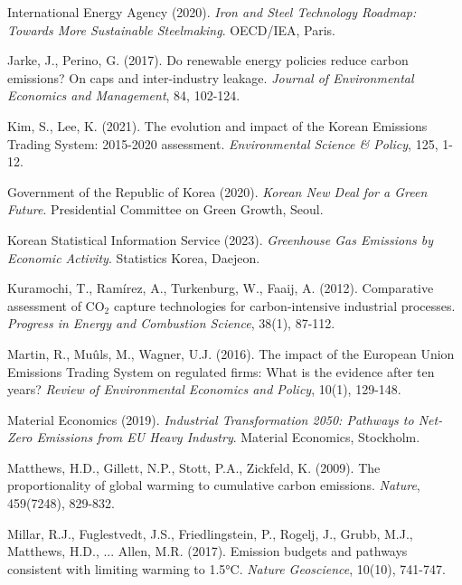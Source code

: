 \documentclass[preprint,1p,authoryear]{elsarticle}
\begin{document}
\begin{thebibliography}{99}
 International Energy Agency (2020). \textit{Iron and Steel Technology Roadmap: Towards More Sustainable Steelmaking}. OECD/IEA, Paris.

 Jarke, J., Perino, G. (2017). Do renewable energy policies reduce carbon emissions? On caps and inter-industry leakage. \textit{Journal of Environmental Economics and Management}, 84, 102-124.

 Kim, S., Lee, K. (2021). The evolution and impact of the Korean Emissions Trading System: 2015-2020 assessment. \textit{Environmental Science \& Policy}, 125, 1-12.

 Government of the Republic of Korea (2020). \textit{Korean New Deal for a Green Future}. Presidential Committee on Green Growth, Seoul.

 Korean Statistical Information Service (2023). \textit{Greenhouse Gas Emissions by Economic Activity}. Statistics Korea, Daejeon.

 Kuramochi, T., Ramírez, A., Turkenburg, W., Faaij, A. (2012). Comparative assessment of CO$_2$ capture technologies for carbon-intensive industrial processes. \textit{Progress in Energy and Combustion Science}, 38(1), 87-112.

 Martin, R., Muûls, M., Wagner, U.J. (2016). The impact of the European Union Emissions Trading System on regulated firms: What is the evidence after ten years? \textit{Review of Environmental Economics and Policy}, 10(1), 129-148.

 Material Economics (2019). \textit{Industrial Transformation 2050: Pathways to Net-Zero Emissions from EU Heavy Industry}. Material Economics, Stockholm.

 Matthews, H.D., Gillett, N.P., Stott, P.A., Zickfeld, K. (2009). The proportionality of global warming to cumulative carbon emissions. \textit{Nature}, 459(7248), 829-832.

 Millar, R.J., Fuglestvedt, J.S., Friedlingstein, P., Rogelj, J., Grubb, M.J., Matthews, H.D., ... Allen, M.R. (2017). Emission budgets and pathways consistent with limiting warming to 1.5°C. \textit{Nature Geoscience}, 10(10), 741-747.


\end{thebibliography}
\end{document}
